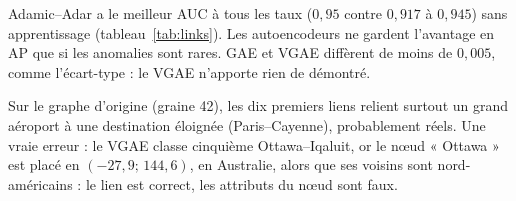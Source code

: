 \begin{table}[!ht]
\centering
\footnotesize
\caption{Liens injectés : moyenne sur 5 graines, écart-type entre parenthèses ($0{,}952(4)=0{,}952\pm0{,}004$). Gras : meilleur. AP aléatoire : $0{,}010$ à $0{,}167$ ($r/(1+r)$).}
\label{tab:links}
\setlength{\tabcolsep}{3pt}
\end{table}

Adamic--Adar a le meilleur AUC à tous les taux ($0{,}95$ contre $0{,}917$ à $0{,}945$) sans apprentissage (tableau~\ref{tab:links}). Les autoencodeurs ne gardent l'avantage en AP que si les anomalies sont rares. GAE et VGAE diffèrent de moins de $0{,}005$, comme l'écart-type : le VGAE n'apporte rien de démontré.

Sur le graphe d'origine (graine 42), les dix premiers liens relient surtout un grand aéroport à une destination éloignée (Paris--Cayenne), probablement réels.
Une vraie erreur : le VGAE classe cinquième Ottawa--Iqaluit, or le nœud « Ottawa » est placé en $(-27{,}9;\,144{,}6)$, en Australie, alors que ses voisins sont nord-américains : le lien est correct, les attributs du nœud sont faux.

